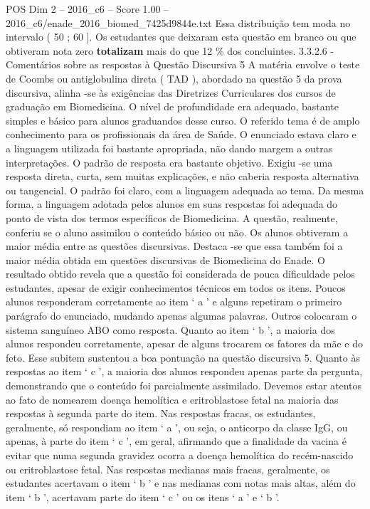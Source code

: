 \begin{textsample}{POS Dim 2 – 2016\_c6 – Score 1.00 – 2016\_c6/enade\_2016\_biomed\_7425d9844e.txt}
Essa distribuição tem moda no intervalo ( 50 ; 60 ].
Os estudantes que deixaram esta questão em branco ou que obtiveram nota zero \textbf{totalizam} mais do que 12 \% dos concluintes. 3.3.2.6 - Comentários sobre as respostas à Questão Discursiva 5 A matéria envolve o teste de Coombs ou antiglobulina direta ( TAD ), abordado na questão 5 da prova discursiva, alinha -se às exigências das Diretrizes Curriculares dos cursos de graduação em Biomedicina.
O nível de profundidade era adequado, bastante simples e básico para alunos graduandos desse curso.
O referido tema é de amplo conhecimento para os profissionais da área de Saúde.
O enunciado estava claro e a linguagem utilizada foi bastante apropriada, não dando margem a outras interpretações.
O padrão de resposta era bastante objetivo.
Exigiu -se uma resposta direta, curta, sem muitas explicações, e não caberia resposta alternativa ou tangencial.
O padrão foi claro, com a linguagem adequada ao tema.
Da mesma forma, a linguagem adotada pelos alunos em suas respostas foi adequada do ponto de vista dos termos específicos de Biomedicina.
A questão, realmente, conferiu se o aluno assimilou o conteúdo básico ou não.
Os alunos obtiveram a maior média entre as questões discursivas.
Destaca -se que essa também foi a maior média obtida em questões discursivas de Biomedicina do Enade.
O resultado obtido revela que a questão foi considerada de pouca dificuldade pelos estudantes, apesar de exigir conhecimentos técnicos em todos os itens.
Poucos alunos responderam corretamente ao item ‘ a ’ e alguns repetiram o primeiro parágrafo do enunciado, mudando apenas algumas palavras.
Outros colocaram o sistema sanguíneo ABO como resposta.
Quanto ao item ‘ b ’, a maioria dos alunos respondeu corretamente, apesar de alguns trocarem os fatores da mãe e do feto.
Esse subitem sustentou a boa pontuação na questão discursiva 5.
Quanto às respostas ao item ‘ c ’, a maioria dos alunos respondeu apenas parte da pergunta, demonstrando que o conteúdo foi parcialmente assimilado.
Devemos estar atentos ao fato de nomearem doença hemolítica e eritroblastose fetal na maioria das respostas à segunda parte do item.
Nas respostas fracas, os estudantes, geralmente, só respondiam ao item ‘ a ’, ou seja, o anticorpo da classe IgG, ou apenas, à parte do item ‘ c ’, em geral, afirmando que a finalidade da vacina é evitar que numa segunda gravidez ocorra a doença hemolítica do recém-nascido ou eritroblastose fetal.
Nas respostas medianas mais fracas, geralmente, os estudantes acertavam o item ‘ b ’ e nas medianas com notas mais altas, além do item ‘ b ’, acertavam parte do item ‘ c ’ ou os itens ‘ a ’ e ‘ b ’.

\end{textsample}
